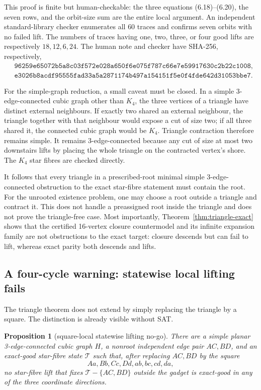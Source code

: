 \documentclass[11pt]{article}
\newtheorem{proposition}[theorem]{Proposition}
\theoremstyle{definition}
\theoremstyle{remark}
\newcommand{\1}{\mathbf 1}
\begin{document}
This proof is finite but human-checkable: the three equations
(6.18)--(6.20), the seven rows, and the orbit-size sum are the entire local
argument.  An independent standard-library checker enumerates all \(60\)
traces and confirms seven orbits with no failed lift.  The numbers of
traces having one, two, three, or four good lifts are respectively
\(18,12,6,24\).  The human note and checker have SHA-256, respectively,
\[
\begin{split}
&\texttt{96259e65072b5a8c03f572e028a650f6e075f787c66e7e59917630c2b22c1008},\\
&\texttt{e3026b8acdf95555fad33a5a2871174b497a154151f5e0f4fde642d31053bbe7}.
\end{split}
\]

For the simple-graph reduction, a small caveat must be closed.  In a simple
3-edge-connected cubic graph other than \(K_4\), the three vertices of a
triangle have distinct external neighbours.  If exactly two shared an
external neighbour, the triangle together with that neighbour would expose
a cut of size two; if all three shared it, the connected cubic graph would
be \(K_4\).  Triangle contraction therefore remains simple.  It remains
3-edge-connected because any cut of size at most two downstairs lifts by
placing the whole triangle on the contracted vertex's shore.  The \(K_4\)
star fibres are checked directly.

It follows that every triangle in a prescribed-root minimal simple
3-edge-connected obstruction to the exact star-fibre statement must contain
the root.  For the unrooted existence problem, one may choose a root outside
a triangle and contract it.  This does not handle a preassigned root inside
the triangle and does not prove the triangle-free case.  Most importantly,
Theorem~\ref{thm:triangle-exact} shows that the certified 16-vertex closure
countermodel and its infinite expansion family are not obstructions to the
exact target: closure descends but can fail to lift, whereas exact parity
both descends and lifts.

\subsection{A four-cycle warning: statewise local lifting fails}

The triangle theorem does not extend by simply replacing the triangle by a
square.  The distinction is already visible without SAT.

\begin{proposition}[square-local statewise lifting no-go]
\label{prop:square-lift-nogo}
There are a simple planar 3-edge-connected cubic graph \(H\), a nonroot
independent edge pair \(AC,BD\), and an exact-good star-fibre state
\(\mathcal T\) such that, after replacing \(AC,BD\) by the square
\[
                 Aa,Bb,Cc,Dd,ab,bc,cd,da,
\]
no star-fibre lift that fixes \(\mathcal T-\{AC,BD\}\) outside the gadget
is exact-good in any of the three coordinate directions.
\end{proposition}
\end{document}
